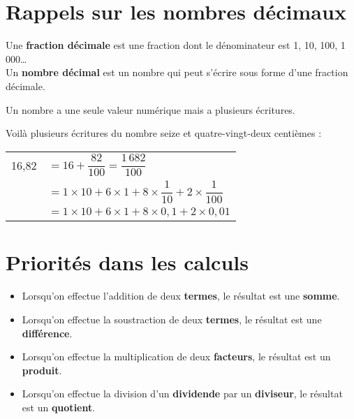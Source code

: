 \cours 

\section{Rappels sur les nombres décimaux}

\begin{definition}
   Une {\bf fraction décimale} est une fraction dont le dénominateur est  1, 10, 100, 1\,000\dots \\
   Un {\bf nombre décimal} est un nombre qui peut s'écrire sous forme d'une fraction décimale.
\end{definition}

\medskip

Un nombre a une seule valeur numérique mais a plusieurs écritures.
   
\begin{exemple*1}
   Voilà plusieurs écritures du nombre seize et quatre-vingt-deux centièmes : \par\smallskip
    {
    \begin{tabular}{cp{13cm}}
      16,82 & $=16+\dfrac{82}{100} =\dfrac{1\,682}{100}$ \\
      & $=1\times10+6\times1+8\times\dfrac{1}{10}+2\times\dfrac{1}{100}$ \\
      & $=1\times10+6\times1+8\times0,1+2\times0,01$ \\ [-5mm]
   \end{tabular}}
\end{exemple*1}


\section{Priorités dans les calculs}

\begin{definition}
   \begin{itemize}
      \item Lorsqu'on effectue l'addition de deux {\bf termes}, le résultat est une {\bf somme}.
      \item Lorsqu'on effectue la soustraction de deux {\bf termes}, le résultat est une {\bf différence}.
      \item Lorsqu'on effectue la multiplication de deux {\bf facteurs}, le résultat est un {\bf produit}.
      \item Lorsqu'on effectue la division d'un {\bf dividende} par un {\bf diviseur}, le résultat est un {\bf quotient}. \\ [-10mm]
   \end{itemize}
\end{definition}

